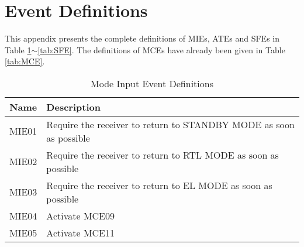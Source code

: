 \section{Event Definitions}
\label{app:event}
\noindent
\setcounter{table}{0}
\renewcommand{\thetable}{A\arabic{table}}
This appendix presents the complete definitions of MIEs, ATEs and SFEs in Table \ref{tab:MIE}$ \sim $\ref{tab:SFE}. The definitions of MCEs have already been given in Table \ref{tab:MCE}.



\begin{table}
	\caption{Mode Input Event Definitions}
	\label{tab:MIE}
	\begin{tabular}{cp{15cm}}
		\hline \hline
		Name & Description \\
		\hline \hline
		MIE01 & Require the receiver to return to STANDBY MODE as soon as possible \\ 
		MIE02 & Require the receiver to return to RTL MODE as soon as possible \\ 
		MIE03 & Require the receiver to return to EL MODE as soon as possible \\
		MIE04 & Activate MCE09 \\ 
		MIE05 & Activate MCE11 \\
		\hline \hline 
	\end{tabular}
\end{table}	

~\\[3cm]

